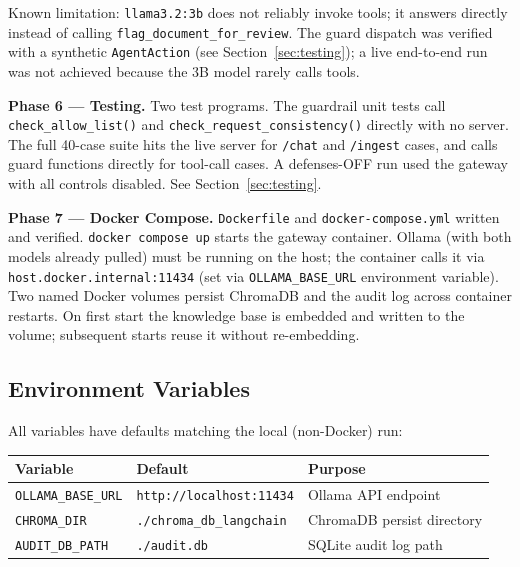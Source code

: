 \documentclass[11pt,a4paper]{article}
\begin{document}
Known limitation: \texttt{llama3.2:3b} does not reliably invoke tools; it
answers directly instead of calling \texttt{flag\_document\_for\_review}.
The guard dispatch was verified with a synthetic \texttt{AgentAction} (see
Section~\ref{sec:testing}); a live end-to-end run was not achieved because
the 3B model rarely calls tools.

\textbf{Phase 6 --- Testing.}
Two test programs. The guardrail unit tests call \texttt{check\_allow\_list()}
and \texttt{check\_request\_consistency()} directly with no server. The full
40-case suite hits the live server for \texttt{/chat} and \texttt{/ingest}
cases, and calls guard functions directly for tool-call cases. A
defenses-OFF run used the gateway with all controls disabled. See
Section~\ref{sec:testing}.

\textbf{Phase 7 --- Docker Compose.}
\texttt{Dockerfile} and \texttt{docker-compose.yml} written and verified.
\texttt{docker compose up} starts the gateway container. Ollama (with both
models already pulled) must be running on the host; the container calls it via
\texttt{host.docker.internal:11434} (set via \texttt{OLLAMA\_BASE\_URL}
environment variable). Two named Docker volumes persist ChromaDB and the audit
log across container restarts. On first start the knowledge base is embedded
and written to the volume; subsequent starts reuse it without re-embedding.

\subsection{Environment Variables}

All variables have defaults matching the local (non-Docker) run:

\begin{center}
\begin{tabular}{lll}
\toprule
\textbf{Variable} & \textbf{Default} & \textbf{Purpose} \\
\midrule
\texttt{OLLAMA\_BASE\_URL} & \texttt{http://localhost:11434} & Ollama API endpoint \\
\texttt{CHROMA\_DIR}       & \texttt{./chroma\_db\_langchain} & ChromaDB persist directory \\
\texttt{AUDIT\_DB\_PATH}   & \texttt{./audit.db}              & SQLite audit log path \\
\bottomrule
\end{tabular}
\end{center}

\end{document}

